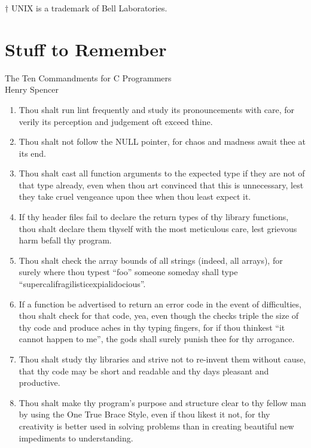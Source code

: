 $\dagger$ UNIX is a trademark of Bell Laboratories. 
\newpage
\section{Stuff to Remember}
\begin{center}
{\Large The Ten Commandments for C Programmers}\\
\vspace {.25in}
Henry Spencer\\
\end{center}
\begin{enumerate}
\item Thou shalt run lint frequently and study its pronouncements with care, for
verily its perception and judgement oft exceed thine. 

\item Thou shalt not follow the NULL pointer, for chaos and madness await thee
at its end. 

\item Thou shalt cast all function arguments to the expected type if they
are not of that type already, even when thou art convinced that this is
unnecessary, lest they take cruel vengeance upon thee when thou least expect
it. 

\item If thy header files fail to declare the return types of thy library
functions, thou shalt declare them thyself with the most meticulous care, lest
grievous harm befall thy program. 

\item Thou shalt check the array bounds of all strings (indeed, all arrays),
for surely where thou  typest ``foo'' someone someday shall type
``supercalifragilisticexpialidocious''. 

\item If a function be advertised to return an error code in the event of
difficulties, thou shalt check for that code, yea, even though the checks
triple the size of thy code and produce aches in thy typing fingers, for if
thou thinkest ``it cannot happen to me'', the gods shall surely punish thee
for thy arrogance. 

\item Thou shalt study thy libraries and strive not to re-invent them without
cause, that thy code may be short and readable and thy days pleasant and
productive.

\item Thou shalt make thy program's purpose and structure clear to thy
fellow man by using the One True Brace Style, even if thou likest it not,
for thy creativity is better used in solving problems than in creating
beautiful new impediments to understanding. 


\end{enumerate}
